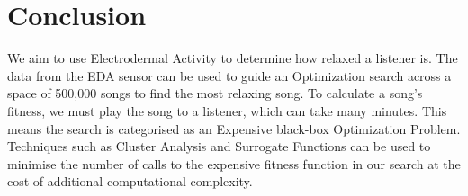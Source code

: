 \documentclass{article}
\begin{document}
	\section{Conclusion}
	We aim to use Electrodermal Activity to determine how relaxed a listener is. The data from the EDA sensor can be used to guide an Optimization search across a space of 500,000 songs to find the most relaxing song. To calculate a song's fitness, we must play the song to a listener, which can take many minutes. This means the search is categorised as an Expensive black-box Optimization Problem. Techniques such as Cluster Analysis and Surrogate Functions can be used to minimise the number of calls to the expensive fitness function in our search at the cost of additional computational complexity.
	
	\newpage
	\begin{footnotesize}
		\begin{multicols}{2}
			
		\end{multicols}
	\end{footnotesize}
	
\end{document}
